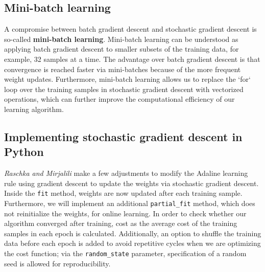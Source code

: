 \documentclass[11pt]{article}
\begin{document}
    \subsection{Mini-batch learning} \label{subsec:ada_sgd_minibatch}

    A compromise between batch gradient descent and stochastic gradient descent is so-called \textbf{mini-batch learning}.
    Mini-batch learning can be understood as applying batch gradient descent to smaller subsets of the training data, for example, 32 samples at a time.
    The advantage over batch gradient descent is that convergence is reached faster via mini-batches because of the more frequent weight updates.
    Furthermore, mini-batch learning allows us to replace the `for` loop over the training samples in stochastic gradient descent with vectorized operations, which can further improve the computational efficiency of our learning algorithm.

    \subsection{Implementing stochastic gradient descent in Python} \label{subsec:ada_sgd_python}

    \textit{Raschka and Mirjalili}\cite{RaschkaMirjalili2017} make a few adjustments to modify the Adaline learning rule using gradient descent to update the weights via stochastic gradient descent.
    Inside the \texttt{fit} method, weights are now updated after each training sample.
    Furthermore, we will implement an additional \texttt{partial\_fit} method, which does not reinitialize the weights, for online learning.
    In order to check whether our algorithm converged after training, cost as the average cost of the training samples in each epoch is calculated.
    Additionally, an option to shuffle the training data before each epoch is added to avoid repetitive cycles when we are optimizing the cost function;
    via the \texttt{random\_state} parameter, specification of a random seed is allowed for reproducibility.
\end{document}
